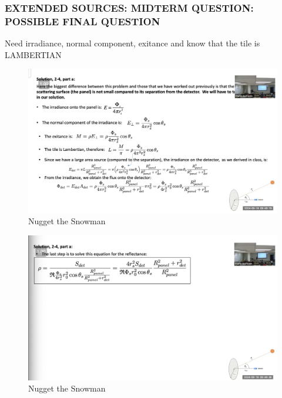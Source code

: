 \documentclass{article}
\begin{document}
\subsubsection{EXTENDED SOURCES: MIDTERM QUESTION: POSSIBLE FINAL QUESTION}

Need irradiance, normal component, exitance and know that the tile is LAMBERTIAN

\begin{figure}[h!]
\centering
\includegraphics[scale=.6]{Radiometry/Week4/Notes/PSET2/P4/P4.png}
\caption{Nugget the Snowman}
\label{fig:P4}
\end{figure}


\begin{figure}[h!]
\centering
\includegraphics[scale=.6]{Radiometry/Week4/Notes/PSET2/P4/P4a.png}
\caption{Nugget the Snowman}
\label{fig:P4}
\end{figure}
\end{document}
